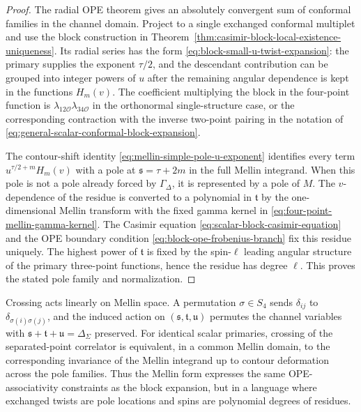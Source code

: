 \begin{proof}
The radial OPE theorem gives an absolutely convergent sum of conformal
families in the channel domain.  Project to a single exchanged conformal
multiplet and use the block construction in
Theorem~\ref{thm:casimir-block-local-existence-uniqueness}.  Its radial
series has the form
\eqref{eq:block-small-u-twist-expansion}: the primary supplies the exponent
\(\tau/2\), and the descendant contribution can be grouped into integer powers
of \(u\) after the remaining angular dependence is kept in the functions
\(H_m(v)\).  The coefficient multiplying the block in the four-point function
is
\(\lambda_{12\mathcal O}\lambda_{34\mathcal O}\) in the orthonormal
single-structure case, or the corresponding contraction with the inverse
two-point pairing in the notation of
\eqref{eq:general-scalar-conformal-block-expansion}.

The contour-shift identity
\eqref{eq:mellin-simple-pole-u-exponent} identifies every term
\(u^{\tau/2+m}H_m(v)\) with a pole at
\(\mathfrak s=\tau+2m\) in the full Mellin integrand.  When this pole is not a
pole already forced by \(\Gamma_\Delta\), it is represented by a pole of
\(M\).  The \(v\)-dependence of the residue is converted to a polynomial in
\(\mathfrak t\) by the one-dimensional Mellin transform with the fixed gamma
kernel in \eqref{eq:four-point-mellin-gamma-kernel}.  The Casimir equation
\eqref{eq:scalar-block-casimir-equation} and the OPE boundary condition
\eqref{eq:block-ope-frobenius-branch} fix this residue uniquely.  The highest
power of \(\mathfrak t\) is fixed by the spin-\(\ell\) leading angular
structure of the primary three-point functions, hence the residue has degree
\(\ell\).  This proves the stated pole family and normalization.
\end{proof}

Crossing acts linearly on Mellin space.  A permutation \(\sigma\in S_4\) sends
\(\delta_{ij}\) to \(\delta_{\sigma(i)\sigma(j)}\), and the induced action on
\((\mathfrak s,\mathfrak t,\mathfrak u)\) permutes the channel variables with
\(\mathfrak s+\mathfrak t+\mathfrak u=\Delta_\Sigma\) preserved.  For
identical scalar primaries, crossing of the separated-point correlator is
equivalent, in a common Mellin domain, to the corresponding invariance of the
Mellin integrand up to contour deformation across the pole families.  Thus the
Mellin form expresses the same OPE-associativity constraints as the block
expansion, but in a language where exchanged twists are pole locations and
spins are polynomial degrees of residues.

